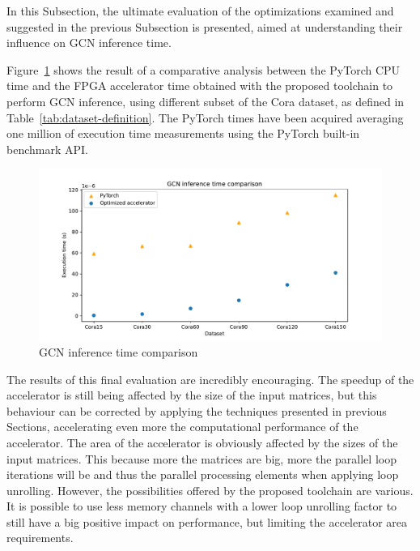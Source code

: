 \documentclass[11pt,a4paper,twocolumn]{article}
\begin{document}
In this Subsection, the ultimate evaluation of the optimizations examined and suggested in the previous Subsection is presented, aimed at understanding their influence on GCN inference time.

Figure~\ref{fig:gcn-inference-comparison} shows the result of a comparative analysis between the PyTorch CPU time and the FPGA accelerator time obtained with the proposed toolchain to perform GCN inference, using different subset of the Cora dataset, as defined in Table~\ref{tab:dataset-definition}.
The PyTorch times have been acquired averaging one million of execution time measurements using the PyTorch built-in benchmark API\@.

\begin{figure}[t]
    \centering
    \includegraphics[height=0.24\textwidth]{Images/gcn_forward_comparison}
    \caption{GCN inference time comparison}
    \label{fig:gcn-inference-comparison}
\end{figure}

The results of this final evaluation are incredibly encouraging.
The speedup of the accelerator is still being affected by the size of the input matrices, but this behaviour can be corrected by applying the techniques presented in previous Sections, accelerating even more the computational performance of the accelerator.
The area of the accelerator is obviously affected by the sizes of the input matrices.
This because more the matrices are big, more the parallel loop iterations will be and thus the parallel processing elements when applying loop unrolling.
However, the possibilities offered by the proposed toolchain are various.
It is possible to use less memory channels with a lower loop unrolling factor to still have a big positive impact on performance, but limiting the accelerator area requirements.

\end{document}
